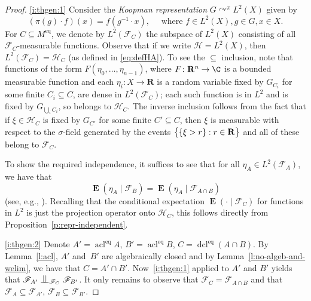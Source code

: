 \documentclass[JEP,XML,SOM,Unicode,published]{cedram}
\let\mathcal\mathscr
\let\actson\curvearrowright
\let\sub\subseteq
\theoremstyle{plain}
\theoremstyle{definition}
\newcommand{\R}{{\mathbf R}}
\newcommand{\cF}{\mathcal{F}}
\newcommand{\cH}{\mathcal{H}}
\DeclareMathOperator{\acl}{acl}
\DeclareMathOperator{\dcl}{dcl}
\DeclareMathOperator{\E}{\mathbf{E}}
\DeclarePairedDelimiter\set{\{}{\}}
\newcommand{\eq}{^{\mathrm{eq}}}
\newcommand{\indep}[1][]{%
  \mathrel{
    \mathop{
      \scalebox{1}[1.3]{\text{$\perp\!\!\!\perp$}}
    }\displaylimits_{#1}
  }
}
\begin{document}
\skpt
\begin{proof}
\eqref{i:thgen:1}
Consider the \emph{Koopman representation} $G \actson^\pi L^2(X)$ given by
\begin{equation*}
(\pi(g) \cdot f)(x) = f(g^{-1} \cdot x), \quad \text{ where } f \in L^2(X), g \in G, x \in X.
\end{equation*}
For $C \sub M\eq$, we denote by $L^2(\cF_C)$ the subspace of $L^2(X)$ consisting of all $\cF_C$\nobreakdash-measurable functions. Observe that if we write $\cH = L^2(X)$, then $L^2(\cF_C) = \cH_C$ (as defined in \eqref{eq:defHA}). To see the $\sub$ inclusion, note that functions of the form $F(\eta_0, \ldots, \eta_{n-1})$, where $F \colon \R^n \to \C$ is a bounded measurable function and each $\eta_i \colon X \to \R$ is a random variable fixed by $G_{C_i}$ for some finite $C_i \sub C$, are dense in $L^2(\cF_C)$; each such function is in $L^2$ and is fixed by $G_{\bigcup_i C_i}$, so belongs to $\cH_C$. The inverse inclusion follows from the fact that if $\xi \in \cH_C$ is fixed by $G_{C'}$ for some finite $C' \sub C$, then $\xi$ is measurable with respect to the $\sigma$-field generated by the events $\set[\big]{\set{\xi > r} : r \in \R}$ and all of these belong to $\cF_C$.

To show the required independence, it suffices to see that for all $\eta_A \in L^2(\cF_A)$, we have that
\begin{equation*}
\E(\eta_A \mid \cF_B) = \E(\eta_A \mid \cF_{A \cap B})
\end{equation*}
(see, e.g., \cite[Prop.\,5.6]{Kallenberg2002}). Recalling that the conditional expectation $\E(\cdot \mid \cF_C)$ for functions in $L^2$ is just the projection operator onto $\cH_C$, this follows directly from Proposition~\ref{p:repr-independent}.

\eqref{i:thgen:2} Denote $A' = \acl\eq A$, $B' = \acl\eq B$, $C = \dcl\eq (A \cap B)$. By Lemma~\ref{l:acl}, $A'$ and~$B'$ are algebraically closed and by Lemma~\ref{l:no-algeb-and-welim}, we have that $C = A' \cap B'$. Now~\eqref{i:thgen:1} applied to $A'$ and $B'$ yields that $\cF_{A'} \indep[\cF_C] \cF_{B'}$. It only remains to observe that $\cF_C = \cF_{A \cap B}$ and that $\cF_A \sub \cF_{A'}$, $\cF_B \sub \cF_{B'}$.
\end{proof}
\end{document}
